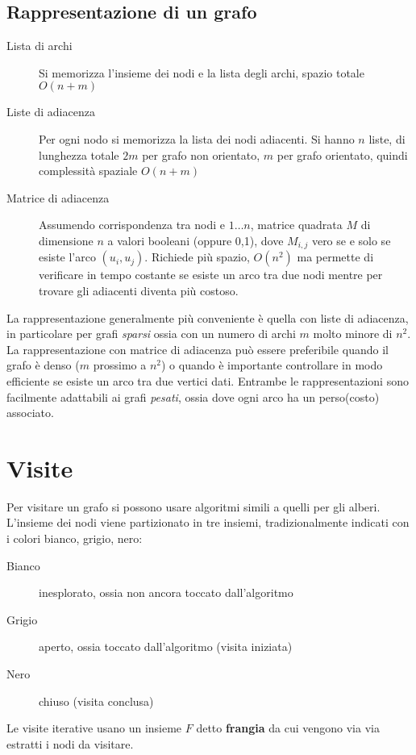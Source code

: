 \documentclass[12pt]{article}
\begin{document}
\subsection{Rappresentazione di un grafo}
\begin{description}
    \item[Lista di archi] Si memorizza l'insieme dei nodi e la lista degli archi, spazio totale $O(n+m)$
    \item[Liste di adiacenza] Per ogni nodo si memorizza la lista dei nodi adiacenti. Si hanno $n$ liste, di lunghezza totale $2m$ per grafo non orientato, $m$ per grafo orientato, quindi complessità spaziale $O(n+m)$
    \item[Matrice di adiacenza] Assumendo corrispondenza tra nodi e $1\dots n$, matrice quadrata $M$ di dimensione $n$ a valori booleani (oppure 0,1), dove $M_{i,j}$ vero se e solo se esiste l'arco $(u_{i},u_{j})$. Richiede più spazio, $O(n^{2})$ ma permette di verificare in tempo costante se esiste un arco tra due nodi mentre per trovare gli  adiacenti diventa più costoso. 
\end{description} 
La rappresentazione generalmente più conveniente è quella con liste di adiacenza, in particolare per grafi \textit{sparsi} ossia con un numero di archi $m$ molto minore di $n^{2}$. La rappresentazione con matrice di adiacenza può essere preferibile quando il grafo è denso ($m$ prossimo a $n^{2}$) o quando è importante controllare in modo efficiente se esiste un arco tra due vertici dati. Entrambe le rappresentazioni sono facilmente adattabili ai grafi \textit{pesati}, ossia dove ogni arco ha un perso(costo) associato.
\section{Visite}
Per visitare un grafo si possono usare algoritmi simili a quelli per gli alberi. L'insieme dei nodi viene partizionato in tre insiemi, tradizionalmente indicati con i colori bianco, grigio, nero:
\begin{description}
    \item[Bianco] inesplorato, ossia non ancora toccato dall'algoritmo
    \item[Grigio] aperto, ossia toccato dall'algoritmo (visita iniziata)
    \item[Nero] chiuso (visita conclusa)
\end{description}
Le visite iterative usano un insieme $F$ detto \textbf{frangia} da cui vengono  via via estratti i nodi da visitare.
\end{document}
